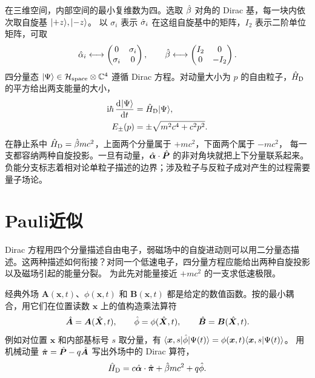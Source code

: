 在三维空间，内部空间的最小复维数为四。选取 $\hat{\beta}$ 对角的 Dirac 基，每一块内依次取自旋基 $\lvert+z\rangle,\lvert-z\rangle$。
以 $\sigma_i$ 表示 $\hat{\sigma}_i$ 在这组自旋基中的矩阵，$I_2$ 表示二阶单位矩阵，可取
\begin{equation}
    \hat{\alpha}_i \longleftrightarrow \begin{pmatrix}0&\sigma_i\\\sigma_i&0\end{pmatrix},\qquad
    \hat{\beta} \longleftrightarrow \begin{pmatrix}I_2&0\\0&-I_2\end{pmatrix}.
\end{equation}
四分量态 $\lvert\Psi\rangle \in \mathcal H_{\mathrm{space}} \otimes \mathbb{C}^4$ 遵循 Dirac 方程。对动量大小为 $p$ 的自由粒子，$\hat{H}_{\mathrm{D}}$ 的平方给出两支能量的大小，
\begin{subequations}
    \begin{align}
        \mathrm{i}\hbar\,\frac{\mathop{}\!\mathrm{d}^{}\lvert\Psi\rangle}{\mathrm{d}{t}^{}} &= \hat{H}_{\mathrm{D}}\lvert\Psi\rangle,\\
        E_\pm(p) &= \pm\sqrt{m^2c^4 + c^2p^2}.
    \end{align}
\end{subequations}
在静止系中 $\hat{H}_{\mathrm{D}} = \hat{\beta} mc^2$，上面两个分量属于 $+mc^2$，下面两个属于 $-mc^2$，
每一支都容纳两种自旋投影。一旦有动量，$\hat{\bm{\alpha}} \cdot \hat{\bm{P}}$ 的非对角块就把上下分量联系起来。
负能分支标志着相对论单粒子描述的边界；涉及粒子与反粒子成对产生的过程需要量子场论。

\section{Pauli近似}
Dirac 方程用四个分量描述自由电子，弱磁场中的自旋进动则可以用二分量态描述。这两种描述如何衔接？对同一个低速电子，四分量方程应能给出两种自旋投影以及磁场引起的能量分裂。
为此先对能量接近 $+mc^2$ 的一支求低速极限。

经典外场 $\bm A(\bm x,t)$、$\phi(\bm x,t)$ 和 $\bm B(\bm x,t)$ 都是给定的数值函数。按的最小耦合，用它们在位置读数 $\bm x$ 上的值构造乘法算符
\[
    \hat{\bm{A}} = \bm A(\hat{\bm{X}},t),\qquad
    \hat{\phi} = \phi(\hat{\bm{X}},t),\qquad
    \hat{\bm{B}} = \bm B(\hat{\bm{X}},t).
\]
例如对位置 $\bm x$ 和内部基标号 $s$ 取分量，有 $\langle\bm x,s\vert\hat{\phi}\vert\Psi(t)\rangle = \phi(\bm x,t)\langle\bm x,s\vert\Psi(t)\rangle$。
用机械动量 $\hat{\bm{\pi}} = \hat{\bm{P}} - q\hat{\bm{A}}$ 写出外场中的 Dirac 算符，
\begin{equation}
    \hat{H}_{\mathrm{D}} = c\hat{\bm{\alpha}} \cdot \hat{\bm{\pi}} + \hat{\beta} mc^2 + q\hat{\phi}.
\end{equation}

